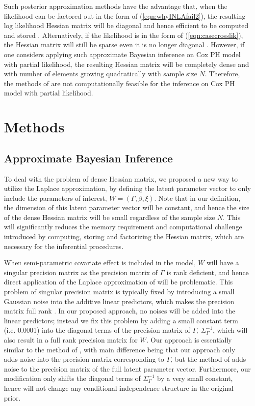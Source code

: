 \documentclass[ba]{imsart}
\begin{document}
Such posterior approximation methods have the advantage that, when the likelihood can be factored out in the form of (\ref{eqn:whyINLAfail2}), the resulting log likelihood Hessian matrix will be diagonal and hence efficient to be computed and stored \citep{inla}. Alternatively, if the likelihood is in the form of (\ref{eqn:casecrosslik}), the Hessian matrix will still be sparse even it is no longer diagonal \citep{casecross}. However, if one considers applying such approximate Bayesian inference on Cox PH model with partial likelihood, the resulting Hessian matrix will be completely dense and with number of elements growing quadratically with sample size $N$. Therefore, the methods of \cite{inla,inlacoxph,casecross} are not computationally feasible for the inference on Cox PH model with partial likelihood. 

\section{Methods}\label{sec:method}


\subsection{Approximate Bayesian Inference}


To deal with the problem of dense Hessian matrix, we proposed a new way to utilize the Laplace approximation, by defining the latent parameter vector to only include the parameters of interest, $W = (\Gamma, \beta, \xi)$. Note that in our definition, the dimension of this latent parameter vector will be constant, and hence the size of the dense Hessian matrix will be small regardless of the sample size $N$. This will significantly reduces the memory requirement and computational challenge introduced by computing, storing and factorizing the Hessian matrix, which are necessary for the inferential procedures. 

When semi-parametric covariate effect is included in the model, $W$ will have a singular precision matrix as the precision matrix of $\Gamma$ is rank deficient, and hence direct application of the Laplace approximation of \cite{tierney} will be problematic. This problem of singular precision matrix is typically fixed by introducing a small Gaussian noise into the additive linear predictors, which makes the precision matrix full rank \citep{casecross, inla}. In our proposed approach, no noises will be added into the linear predictors; instead we fix this problem by adding a small constant term (i.e. 0.0001) into the diagonal terms of the precision matrix of $\Gamma$, $\Sigma^{-1}_\Gamma$, which will also result in a full rank precision matrix for $W$. Our approach is essentially similar to the method of \cite{casecross,inla}, with main difference being that our approach only adds noise into the precision matrix corresponding to $\Gamma$, but the method of \cite{casecross,inla} adds noise to the precision matrix of the full latent parameter vector. Furthermore, our modification only shifts the diagonal terms of $\Sigma^{-1}_\Gamma$ by a very small constant, hence will not change any conditional independence structure in the original prior.
\end{document}
